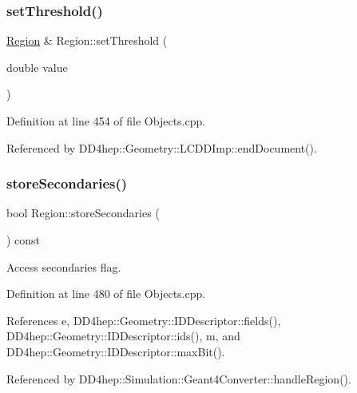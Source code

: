 \subsubsection{\texorpdfstring{set\+Threshold()}{setThreshold()}}
{\footnotesize\ttfamily \hyperlink{class_d_d4hep_1_1_geometry_1_1_region}{Region} \& Region\+::set\+Threshold (\begin{DoxyParamCaption}\item[{double}]{value }\end{DoxyParamCaption})}



Definition at line 454 of file Objects.\+cpp.



Referenced by D\+D4hep\+::\+Geometry\+::\+L\+C\+D\+D\+Imp\+::end\+Document().

\hypertarget{class_d_d4hep_1_1_geometry_1_1_region_a9e87910102de676ba08f9bbfc6cec063}{}\label{class_d_d4hep_1_1_geometry_1_1_region_a9e87910102de676ba08f9bbfc6cec063} 
\subsubsection{\texorpdfstring{store\+Secondaries()}{storeSecondaries()}}
{\footnotesize\ttfamily bool Region\+::store\+Secondaries (\begin{DoxyParamCaption}{ }\end{DoxyParamCaption}) const}



Access secondaries flag. 



Definition at line 480 of file Objects.\+cpp.



References e, D\+D4hep\+::\+Geometry\+::\+I\+D\+Descriptor\+::fields(), D\+D4hep\+::\+Geometry\+::\+I\+D\+Descriptor\+::ids(), m, and D\+D4hep\+::\+Geometry\+::\+I\+D\+Descriptor\+::max\+Bit().



Referenced by D\+D4hep\+::\+Simulation\+::\+Geant4\+Converter\+::handle\+Region().

\hypertarget{class_d_d4hep_1_1_geometry_1_1_region_ab1320c514927b9a775a31cec3c8c7cf3}{}\label{class_d_d4hep_1_1_geometry_1_1_region_ab1320c514927b9a775a31cec3c8c7cf3} 
